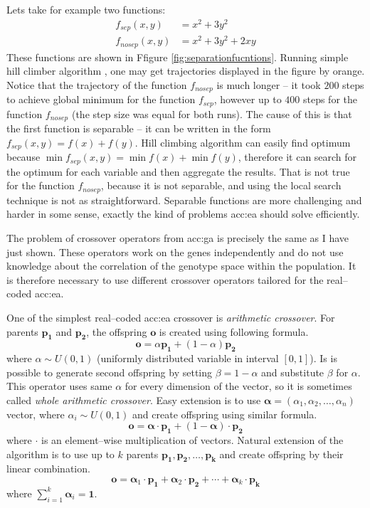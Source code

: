 Lets take for example two functions:
\begin{align*}
    f_{sep}(x,y)&=x^2+3y^2 \\
    f_{nosep}(x,y)&=x^2+3y^2+2xy
\end{align*}
These functions are shown in Ffigure \ref{fig:separationfucntions}. Running simple hill climber algorithm \citep{HandbookOfMetaheuristics}, one may get trajectories displayed in the figure by orange. Notice that the trajectory of the function $f_{nosep}$ is much longer -- it took $200$ steps to achieve global minimum for the function $f_{sep}$, however up to $400$ steps for the function $f_{nosep}$ (the step size was equal for both runs). The cause of this is that the first function is separable -- it can be written in the form $f_{sep}(x,y)=f(x)+f(y)$. Hill climbing algorithm can easily find optimum because $\min f_{sep}(x,y)=\min f(x)+\min f(y)$, therefore it can search for the optimum for each variable and then aggregate the results. That is not true for the function $f_{nosep}$, because it is not separable, and using the local search technique is not as straightforward. Separable functions are more challenging and harder in some sense, exactly the kind of problems \acrshort{acc:ea} should solve efficiently.

The problem of crossover operators from \acrshort{acc:ga} is precisely the same as I have just shown. These operators work on the genes independently and do not use knowledge about the correlation of the genotype space within the population. It is therefore necessary to use different crossover operators tailored for the real--coded \acrshort{acc:ea}.

One of the simplest real--coded \acrshort{acc:ea} crossover is \emph{arithmetic crossover}. For parents $\mathbf{p_1}$ and $\mathbf{p_2}$, the offspring $\mathbf{o}$ is created using following formula.
$$
\mathbf{o} = \alpha\mathbf{p_1}+\left(1-\alpha\right)\mathbf{p_2}
$$
where $\alpha \sim U(0,1)$ (uniformly distributed variable in interval $\left[0,1\right]$). Is is possible to generate second offspring by setting $\beta=1-\alpha$ and substitute $\beta$ for $\alpha$. This operator uses same $\alpha$ for every dimension of the vector, so it is sometimes called \emph{whole arithmetic crossover}. Easy extension is to use $\boldsymbol{\alpha}=(\alpha_1,\alpha_2,\dots,\alpha_n)$ vector, where $\alpha_i\sim U(0,1)$ and create offspring using similar formula.
$$
\mathbf{o} = \boldsymbol{\alpha}\cdot\mathbf{p_1}+\left(1-\boldsymbol{\alpha}\right)\cdot\mathbf{p_2}
$$
where $\cdot$ is an element--wise multiplication of vectors.
Natural extension of the algorithm is to use up to $k$ parents $\mathbf{p_1}, \mathbf{p_2},\dots,\mathbf{p_k}$ and create offspring by their linear combination.
$$
\mathbf{o} = 
\boldsymbol{\alpha}_1\cdot\mathbf{p_1}+
\boldsymbol{\alpha}_2\cdot\mathbf{p_2}+
\cdots +
\boldsymbol{\alpha}_k\cdot\mathbf{p_k}
$$
where $\sum_{i=1}^{k}\boldsymbol{\alpha}_i=\boldsymbol{1}$.

